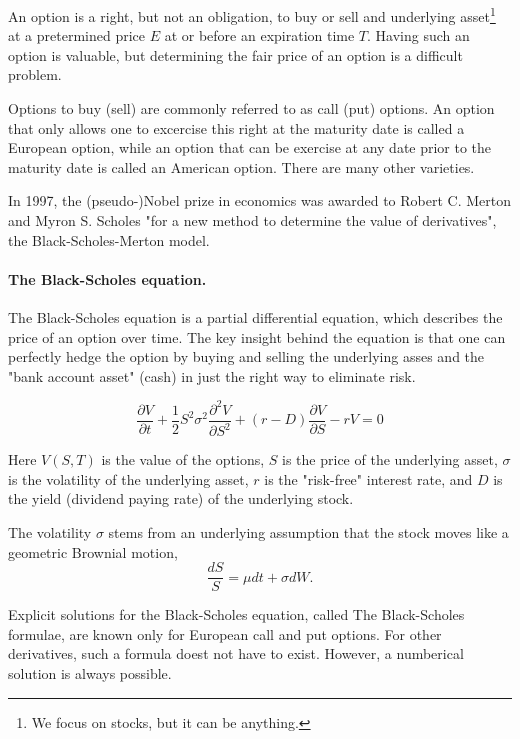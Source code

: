 \documentclass[%
oneside,                 %
final,                   %
10pt]{article}
\begin{document}
An option is a right, but not an obligation, to buy or sell 
and underlying asset\footnote{We focus on stocks, but it can be anything.} at a pretermined price $E$ at or before 
an expiration time $T$. Having such an option is valuable, but
determining the fair price of an option is a difficult problem.



Options to buy (sell) are commonly referred to as 
call (put) options. An option that only allows one to 
excercise this right at the maturity date is called a 
European option, while an option that can be exercise at any 
date prior to the maturity date is called an American option.
There are many other varieties.

In 1997, the (pseudo-)Nobel prize in economics was awarded 
to Robert C. Merton and Myron S. Scholes "for a new method
to determine the value of derivatives", the Black-Scholes-Merton
model.

\paragraph{The Black-Scholes equation.}
The Black-Scholes equation is a partial differential equation, which 
describes the price of an option over time. The key insight behind the 
equation is that one can perfectly hedge the option by 
buying and selling the underlying asses and the "bank account 
asset" (cash) in just the right way to eliminate risk.

\begin{equation}
    \frac{\partial V}{\partial t}
    + \frac{1}{2}S^2\sigma^2\frac{\partial^2 V}{\partial S^2}
    + (r - D)\frac{\partial V}{\partial S} - r V = 0
\end{equation}

Here $V(S, T)$ is the value of the options, $S$ is the price of the 
underlying asset, $\sigma$ is the volatility of the underlying asset,
$r$ is the "risk-free" interest rate, and $D$ is the yield
(dividend paying rate) of the underlying stock.

The volatility $\sigma$ stems from an underlying assumption that 
the stock moves like a geometric Brownial motion,
\begin{equation}
    \frac{dS}{S} = \mu dt + \sigma dW.
\end{equation}

Explicit solutions for the Black-Scholes equation,
called The Black-Scholes formulae, are known only for 
European call and put options. For other derivatives, such 
a formula doest not have to exist. However, a numberical solution is 
always possible.
\end{document}
